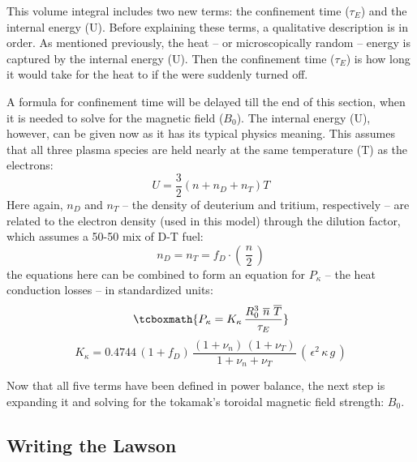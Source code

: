 This volume integral includes two new terms: the confinement time ($\tau_E$) and the internal energy (U). Before explaining these terms, a qualitative description is in order. As mentioned previously, the heat -- or microscopically random -- energy is captured by the internal energy (U). Then the confinement time ($\tau_E$) is how long it would take for the heat to  if the  were suddenly turned off.

A formula for confinement time will be delayed till the end of this section, when it is needed to solve for the magnetic field ($B_0$). The internal energy (U), however, can be given now as it has its typical physics meaning. This assumes that all three plasma species are held nearly at the same temperature (T) as the electrons:
\begin{equation}
	U = \frac{3}{2} \left( n + n_D + n_T \right) T
\end{equation}
Here again, $n_D$ and $n_T$ -- the density of deuterium and tritium, respectively -- are related to the electron density (used in this model) through the dilution factor, which assumes a 50-50 mix of D-T fuel:
\begin{equation}
	n_D = n_T = f_D \cdot \left( \, \frac{n}{2} \, \right)
\end{equation}
 the equations here can be combined to form an equation for $P_\kappa$ -- the heat conduction losses -- in standardized units:
\begin{equation}
	\label{eq:pkappa}
	\tcboxmath{
	P_\kappa = K_\kappa \, \frac{ R_0 ^ 3 \ \overline{n}  \ \overline{T}  }{\tau_E}
	}
\end{equation}
\begin{equation}
	K_\kappa = 0.4744 \, ( 1 + f_D ) \, \frac{ (1 + \nu_n) \, (1 + \nu_T) }{1 + \nu_n + \nu_T } \, ( \, \epsilon^2 \, \kappa \, g \, )
\end{equation}

Now that all five terms have been defined in power balance, the next step is expanding it and solving for the tokamak's toroidal magnetic field strength: $B_0$.

\subsection{Writing the Lawson }

